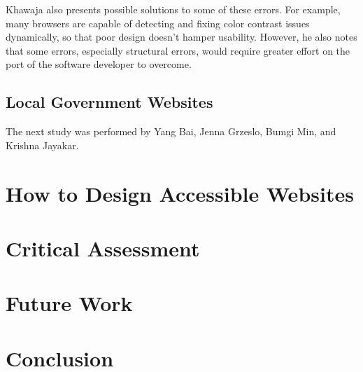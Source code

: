 \documentclass{article}
\begin{document}
Khawaja also presents possible solutions to some of these errors.
For example, many browsers are capable of detecting and fixing color contrast issues dynamically, so that poor design doesn't hamper usability.
However, he also notes that some errors, especially structural errors, would require greater effort on the port of the software developer to overcome.

\subsection{Local Government Websites}
The next study was performed by Yang Bai, Jenna Grzeslo, Bumgi Min, and Krishna Jayakar.

\cite{LocalGovernment}

\section{How to Design Accessible Websites}


\section{Critical Assessment}


\section{Future Work}



\section{Conclusion}


\small


\end{document}
